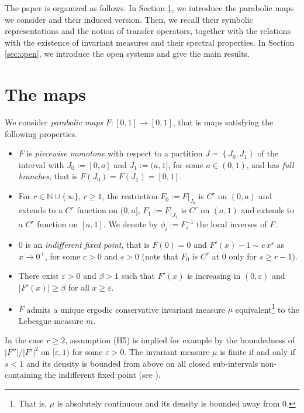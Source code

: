 \documentclass{amsart}
\theoremstyle{definition}
\theoremstyle{remark}
\theoremstyle{definition}
\numberwithin{equation}{section}
\newcommand{\set}[1]{\left\{#1\right\}}
\newcommand{\N}{\mathbb N}
\newcommand{\eps}{\varepsilon}
\begin{document}
The paper is organized as follows. In Section \ref{sec:maps}, we introduce the parabolic maps we consider and their induced version. Then, we recall their symbolic representations and the notion of transfer operators, together with the relations with the existence of invariant measures and their spectral properties. In Section \ref{sec:open}, we introduce the open systems and give the main results.

\section{The maps} \label{sec:maps}
We consider \emph{parabolic maps} $F:[0,1]\to [0,1]$, that is maps satisfying the following properties.
\begin{itemize}
\item[(H1)] $F$ is \emph{piecewise monotone} with respect to a partition $J=\set{J_0,J_1}$ of the interval with $J_{0} :=[0,a]$ and $J_{1} := (a,1]$, for some $a\in (0,1)$, and has \emph{full branches}, that is $F(J_0)=\overline{F(J_1)}=[0,1]$.
\item[(H2)] For $r\in \N \cup \{\infty\}$, $r\ge 1$, the restriction $F_0:=F|_{J_0}$ is $C^r$ on $(0,a)$ and extends to a $C^r$ function on $(0,a]$, $F_1:=F|_{J_1}$ is $C^r$ on $(a,1)$ and extends to a $C^r$ function on $[a,1]$. We denote by $\phi_i := F_i^{-1}$ the local inverses of $F$.
\item[(H3)] $0$ is an \emph{indifferent fixed point}, that is $F(0)=0$ and $F'(x) -1 \sim c\, x^{s}$ as $x\to 0^+$, for some $c>0$ and $s > 0$ (note that $F_0$ is $C^r$ at $0$ only for $s \ge r-1$).
\item[(H4)] There exist $\eps>0$ and $\beta>1$ such that $F'(x)$ is increasing in $(0,\eps)$ and $|F'(x)|\ge \beta$ for all $x\ge \eps$.
\item[(H5)] $F$ admits a unique ergodic conservative invariant measure $\mu$ equivalent\footnote{That is, $\mu$ is absolutely continuous and its density is bounded away from 0.} to the Lebesgue measure $m$.
\end{itemize}

In the case $r\ge 2$, assumption (H5) is implied for example by the boundedness of $|F''|/|F'|^2$ on $[\eps,1)$ for some $\eps>0$. The invariant measure $\mu$ is finite if and only if $s<1$ and its density is bounded from above on all closed sub-intervals non-containing the indifferent fixed point (see \cite{Th1,Th2}).
\end{document}
